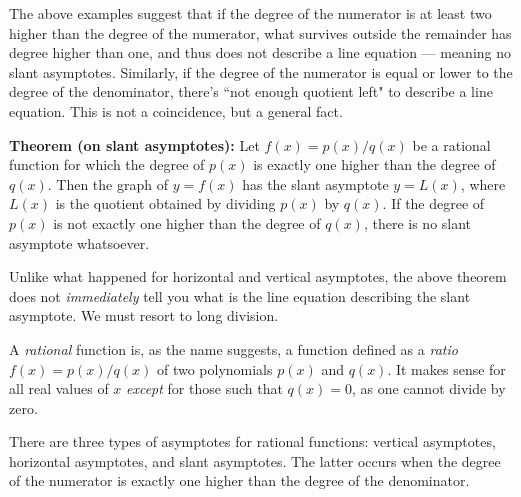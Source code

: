 \documentclass{ximera}
\begin{document}
\begin{example}
\end{example}

The above examples suggest that if the degree of the numerator is at least two higher than the degree of the numerator, what survives outside the remainder has degree higher than one, and thus does not describe a line equation --- meaning no slant asymptotes. Similarly, if the degree of the numerator is equal or lower to the degree of the denominator, there's ``not enough quotient left" to describe a line equation. This is not a coincidence, but a general fact.

\begin{callout}
  {\bf Theorem (on slant asymptotes):} Let $f(x) = p(x)/q(x)$ be a rational function for which the degree of $p(x)$ is exactly one higher than the degree of $q(x)$. Then the graph of $y=f(x)$ has the slant asymptote $y=L(x)$, where $L(x)$ is the quotient obtained by dividing $p(x)$ by $q(x)$. If the degree of $p(x)$ is not exactly one higher than the degree of $q(x)$, there is no slant asymptote whatsoever.
\end{callout}

\begin{explanation}
  Unlike what happened for horizontal and vertical asymptotes, the above theorem does not \emph{immediately} tell you what is the line equation describing the slant asymptote. We must resort to long division.
\end{explanation}


\begin{summary}
\item A \emph{rational} function is, as the name suggests, a function defined as a \emph{ratio} $f(x) = p(x)/q(x)$ of two polynomials $p(x)$ and $q(x)$. It makes sense for all real values of $x$ \emph{except} for those such that $q(x) = 0$, as one cannot divide by zero.
\item There are three types of asymptotes for rational functions: vertical asymptotes, horizontal asymptotes, and slant asymptotes. The latter occurs when the degree of the numerator is exactly one higher than the degree of the denominator.
\end{summary}
\end{document}
